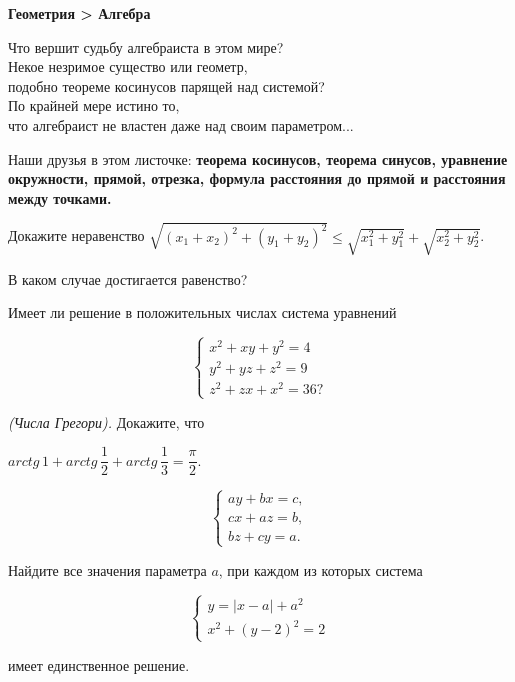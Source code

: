 \centerline{\bf \Huge Геометрия > Алгебра}
\centerline{\bf \Huge }

\begin{flushright}
        \scriptsize{Что вершит судьбу алгебраиста в этом мире?\\ Некое незримое существо или геометр, \\подобно теореме косинусов парящей над системой?\\ По крайней мере истино то,\\ что алгебраист не властен даже над своим параметром...}
\end{flushright}

Наши друзья в этом листочке: \textbf{теорема косинусов, теорема синусов, уравнение окружности, прямой, отрезка, формула расстояния до прямой и расстояния между точками.}

Докажите неравенство
$\sqrt{\left(x_1+x_2\right)^2+\left(y_1+y_2\right)^2} \leq \sqrt{x_1^2+y_1^2}+\sqrt{x_2^2+y_2^2}$.

В каком случае достигается равенство?

Имеет ли решение в положительных числах система уравнений

$$\left\{
\begin{array}{l}
    x^2+x y+y^2=4 \\
    y^2+y z+z^2=9 \\
    z^2+z x+x^2=36 ?
\end{array}
\right.$$


\textit{(Числа Грегори).} Докажите, что

$arctg\, 1+arctg\,\dfrac{1}{2} + arctg\, \dfrac{1}{3}=\dfrac{\pi}{2}.$

$$\left\{\begin{array}{l}
    ay+b x=c, \\
    cx+a z=b, \\
    bz+c y=a .
\end{array}\right.$$

Найдите все значения параметра $a$, при каждом из которых система

$$
\left\{\begin{array}{l}
y=|x-a|+a^2 \\
x^2+(y-2)^2=2
\end{array}\right.
$$


имеет единственное решение.

\newpage

\hspace{3mm}

